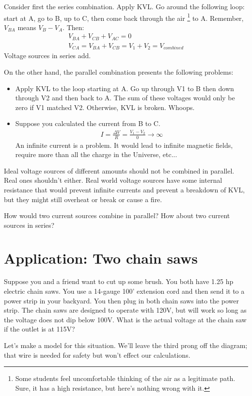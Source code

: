Consider first the series combination. Apply KVL. Go around the following loop: start at A, go to B, up to C, then come back through the air \footnote{Some students feel uncomfortable thinking of the air as a legitimate path. Sure, it has a high resistance, but here's nothing wrong with it.} to A. Remember, $V_{BA}$ means $V_B-V_A$. Then:
\begin{align}
V_{BA}+V_{CB}+V_{AC}=0\\
V_{CA}=V_{BA}+V_{CB} =V_1+V_2 =V_{combined}
\end{align}
Voltage sources in series add.\par

On the other hand, the parallel combination presents the following problems:
\begin{itemize}
\item Apply KVL to the loop starting at A. Go up through V1 to B then down through V2 and then back to A. The sum of these voltages would only be zero if V1 matched V2. Otherwise, KVL is broken. Whoops.
\item Suppose you calculated the current from B to C. 
\begin{align}
I=\frac{\Delta V}{R}=\frac{V_1-V_2}{0} \rightarrow \infty
\end{align}
An infinite current is a problem. It would lead to infinite magnetic fields, require more than all the charge in the Universe, etc...
\end{itemize}
Ideal voltage sources of different amounts should not be combined in parallel. Real ones shouldn't either. Real world voltage sources have some internal resistance that would prevent infinite currents and prevent a breakdown of KVL, but they might still overheat or break or cause a fire.

\begin{clevel}
How would two current sources combine in parallel? How about two current sources in series?
\end{clevel}

\section{Application: Two chain saws}
Suppose you and a friend want to cut up some brush. You both have 1.25 hp electric chain saws. You use a 14-gauge 100' extension cord and then send it to a power strip in your backyard. You then plug in both chain saws into the power strip. The chain saws are designed to operate with 120V, but will work so long as the voltage does not dip below 100V. What is the actual voltage at the chain saw if the outlet is at 115V?
\par
Let's make a model for this situation. We'll leave the third prong off the diagram; that wire is needed for safety but won't effect our calculations.


